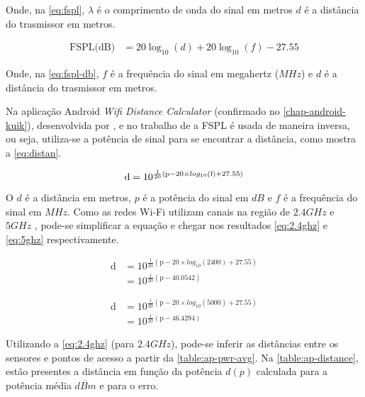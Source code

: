 Onde, na \autoref{eq:fspl}, $\lambda$ é o comprimento de onda do sinal em metros
$d$ é a distância do trasmissor em metros.

\begin{align}
	\mbox{FSPL(dB)}	&= 20\log _{{10}}( d )+20\log _{{10}}( f ) - 27.55 \label{eq:fspl-db}
\end{align}

Onde, na \autoref{eq:fspl-db}, $f$ é a frequência do sinal em megahertz ($MHz$)
e $d$ é a distância do trasmissor em metros.

Na aplicação Android \emph{Wifi Distance Calculator} (confirmado no
\autoref{chap-android-kuik}), desenvolvida por , e no
trabalho de  a FSPL é usada de maneira inversa, ou seja,
utiliza-se a potência de sinal para se encontrar a distância, como mostra a
\autoref{eq:distan}.

\begin{equation}
	\text{d} = 10 ^{ \frac{1}{20} \left( \text{p} - 20 \times log_{10}\left(\text{f}\right)  + 27.55 \right) } \label{eq:distan}\\
\end{equation}

O $d$ é a distância em metros, $p$ é a potência do sinal em $dB$ e $f$ é a
frequência do sinal em $MHz$. Como as redes Wi-Fi utilizam canais na região de
$2.4GHz$ e $5GHz$ \cite{ieee80211}, pode-se simplificar a equação e chegar nos
resultados \autoref{eq:2.4ghz} e \autoref{eq:5ghz} respectivamente.

\begin{align}
\text{d}	&= 10 ^{ \frac{1}{20} \left( \text{p} - 20 \times log_{10}\left(\text{2400}\right)  + 27.55 \right) } \nonumber \\
			&= 10 ^{ \frac{1}{20} \left( \text{p} - 40.0542 \right) } \label{eq:2.4ghz}
\end{align}

\begin{align}
\text{d}	&= 10 ^{ \frac{1}{20} \left( \text{p} - 20 \times log_{10}\left(\text{5000}\right)  + 27.55 \right) } \nonumber \\
			&= 10 ^{ \frac{1}{20} \left( \text{p} - 46.4294 \right) } \label{eq:5ghz}
\end{align}

Utilizando a \autoref{eq:2.4ghz} (para $2.4GHz$), pode-se inferir as distâncias
entre os sensores e pontos de acesso a partir da \autoref{table:ap-pwr-avg}. Na
\autoref{table:ap-distance}, estão presentes a distância em função da potência
$d(p)$ calculada para a potência média $\overline{dBm}$ e para o erro.


